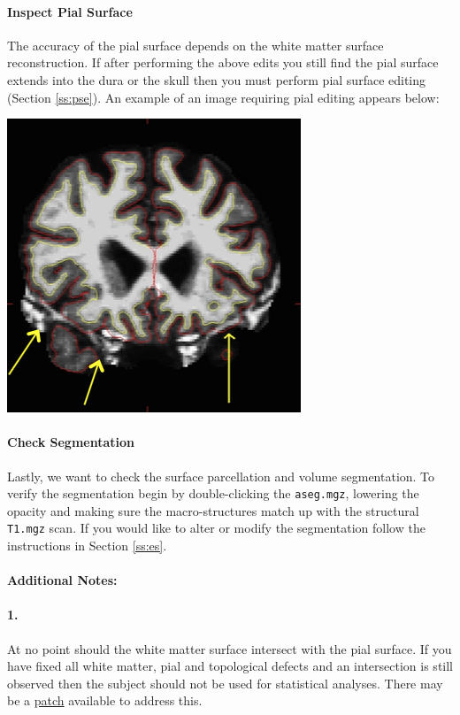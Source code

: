 \documentclass[paper=a4, fontsize=11pt]{scrartcl} %
\numberwithin{equation}{section} %
\numberwithin{figure}{section} %
\numberwithin{table}{section} %
\begin{document}
\paragraph{Inspect Pial Surface}  The accuracy of the pial surface depends on the white matter surface reconstruction. If after performing the above edits you still find the pial surface extends into the dura or the skull then you must perform pial surface editing (Section \ref{ss:pse}).  An example of an image requiring pial editing appears below:

\includegraphics[scale=0.6]{pial.png}

\paragraph{Check Segmentation}  Lastly, we want to check the surface parcellation and volume segmentation.  To verify the segmentation begin by double-clicking the \texttt{aseg.mgz}, lowering the opacity and making sure the macro-structures match up with the structural \texttt{T1.mgz} scan.  If you would like to alter or modify the segmentation follow the instructions in Section \ref{ss:es}.

\paragraph{Additional Notes:}  \paragraph{1.} At no point should the white matter surface intersect with the pial surface. If you have fixed all white matter, pial and topological defects and an intersection is still observed then the subject should not be used for statistical analyses.  There may be a \href{https://www.mail-archive.com/freesurfer%40nmr.mgh.harvard.edu/msg39636.html}{patch} available to address this.
\end{document}
